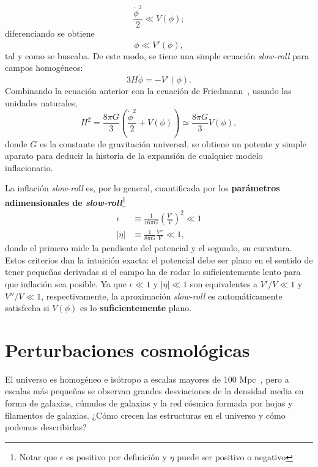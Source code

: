 \begin{equation}
    \frac{\dot{\phi}^2}{2}\ll V(\phi);
\end{equation}
diferenciando se obtiene
\begin{equation}
    \ddot{\phi}\ll V'(\phi),
\end{equation}
tal y como se buscaba. De este modo, se tiene una simple ecuación \textit{slow-roll} para campos homogéneos:
\begin{equation}
    3H\dot{\phi}=-V'(\phi).
\end{equation}
Combinando la ecuación anterior con la ecuación de Friedmann~\cite{friedmann1922125}, usando las unidades naturales,
\begin{equation}
    H^2=\frac{8\pi G}{3}\left(\frac{\dot{\phi}^2}{2}+V(\phi)\right)\simeq \frac{8\pi G}{3}V(\phi),
\end{equation}
donde \(G\) es la constante de gravitación universal, se obtiene un potente y simple aparato para deducir la historia de la expansión de cualquier modelo inflacionario.

La inflación \textit{slow-roll} es, por lo general, cuantificada por los \textbf{parámetros adimensionales de \textit{slow-roll}}\footnote{Notar que \(\epsilon\) es positivo por definición y \(\eta\) puede ser positivo o negativo}
\begin{subequations}
    \begin{align}
        \epsilon&\equiv\frac{1}{16\pi G}\left(\frac{V'}{V}\right)^2\ll 1\\
        \left|\eta\right|&\equiv\frac{1}{8\pi G}\frac{V''}{V}\ll 1,
    \end{align}
    \label{eq::slowroll}
\end{subequations}
donde el primero mide la pendiente del potencial y el segundo, su curvatura. Estos criterios dan la intuición exacta: el potencial debe ser plano en el sentido de tener pequeñas derivadas si el campo ha de rodar lo suficientemente lento para que inflación sea posible. Ya que \(\epsilon\ll 1\) y \(\left|\eta\right|\ll 1\) son equivalentes a \(V'/V\ll 1\) y \(V''/V\ll 1\), respectivamente, la aproximación \textit{slow-roll} es automáticamente satisfecha si \(V(\phi)\) es lo \textbf{suficientemente} plano.
\section{Perturbaciones cosmológicas}
El universo es homogéneo e isótropo a escalas mayores de 100 Mpc~\cite{baumann2022cosmology}, pero a escalas más pequeñas se observan grandes desviaciones de la densidad media en forma de galaxias, cúmulos de galaxias y la red cósmica formada por hojas y filamentos de galaxias. ¿Cómo crecen las estructuras en el universo y cómo podemos describirlas?

